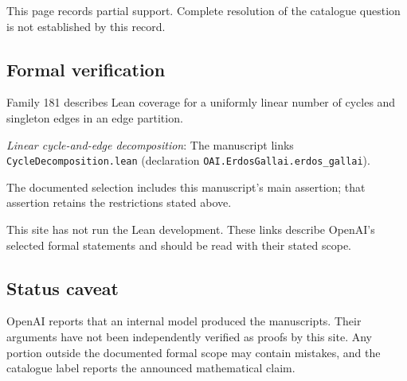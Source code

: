 \documentclass[11pt]{article}
\begin{document}
This page records partial support. Complete resolution of the catalogue question is not established by this record.

\subsection{Formal verification}
Family 181 describes Lean coverage for a uniformly linear number of cycles and singleton edges in an edge partition.

\textit{Linear cycle-and-edge decomposition}: The manuscript links \texttt{CycleDecomposition.lean} (declaration \texttt{OAI.ErdosGallai.erdos\_gallai}).

The documented selection includes this manuscript’s main assertion; that assertion retains the restrictions stated above.

This site has not run the Lean development. These links describe OpenAI’s selected formal statements and should be read with their stated scope.

\subsection{Status caveat}
OpenAI reports that an internal model produced the manuscripts. Their arguments have not been independently verified as proofs by this site. Any portion outside the documented formal scope may contain mistakes, and the catalogue label reports the announced mathematical claim.
\end{document}

